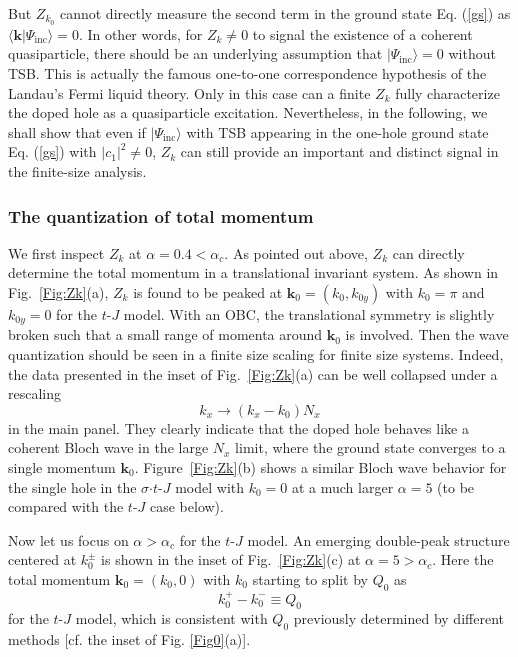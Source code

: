 \documentclass[aps,prb,twocolumn,notitlepage,superscriptaddress,showpacs]{revtex4-1}
\begin{document}
But $Z_{k_0}$ cannot directly measure the second term in the ground state Eq. (\ref{gs}) as $\langle {\textbf{k}}|\Psi_{\mathrm {inc}}\rangle = 0$. In other words, for $Z_k\neq 0$ to signal the existence of a coherent quasiparticle, there should be an underlying assumption that $|\Psi_{\mathrm {inc}}\rangle=0 $ without TSB. This is actually the famous one-to-one correspondence hypothesis \cite{Andersonbook} of the Landau's Fermi liquid theory.
Only in this case can a finite $Z_k$ fully characterize the doped hole as a quasiparticle excitation.
Nevertheless, in the following, we shall show that even if $|\Psi_{\mathrm {inc}}\rangle $ with TSB appearing in the one-hole ground state Eq. (\ref{gs}) with $|c_1|^2\neq 0$, $Z_k$ can still provide an important and distinct signal in the finite-size analysis.


\subsubsection{The quantization of total momentum }

We first inspect $Z_k$ at $\alpha=0.4<\alpha_c$. As pointed out above, $Z_k$ can directly determine the total momentum in a translational invariant system. As shown in Fig.~\ref{Fig:Zk}(a), $Z_k$ is found to be peaked at ${\textbf{k}}_0=(k_0, k_{0y})$ with $k_0=\pi$ and $k_{0y}=0$ for the $t$-$J$ model. With an OBC, the translational symmetry is slightly broken such that a small range of momenta around ${\textbf{k}}_0$ is involved.
 Then the wave quantization should be seen in a finite size scaling for finite size systems.  Indeed, the data presented in the inset of Fig.~\ref{Fig:Zk}(a) can be well collapsed under a rescaling
 \begin{equation}\label{scalingI}
k_x \rightarrow (k_x-{k}_0)N_x
\end{equation}
in the main panel. They clearly indicate that the doped hole behaves like a coherent Bloch wave in the large $N_x$ limit, where the ground state converges to a single momentum ${ \textbf{k}}_0$. Figure~\ref{Fig:Zk}(b) shows a similar Bloch wave behavior for the single hole in the $\sigma$$\cdot$$t$-$J$ model with $ k_0=0$ at a much larger $\alpha=5$ (to be compared with the $t$-$J$ case below).


Now let us focus on $\alpha>\alpha_c$ for the $t$-$J$ model. An emerging double-peak structure centered at $k_0^{\pm}$ is shown in the inset of Fig.~\ref{Fig:Zk}(c) at $\alpha=5>\alpha_c$.  Here the total momentum ${\textbf{k}}_0=(k_0, 0)$ with $k_0$ starting to split by $Q_0$ as
\begin{equation}\label{Q0}
k_0^{+}-k_0^{-}\equiv Q_0
\end{equation}
for the $t$-$J$ model, which is consistent with $Q_0$ previously determined by different methods \cite{ZZ2014qp,ZZ2014cm,WSK2015} [cf. the inset of Fig. \ref{Fig0}(a)].
\end{document}
